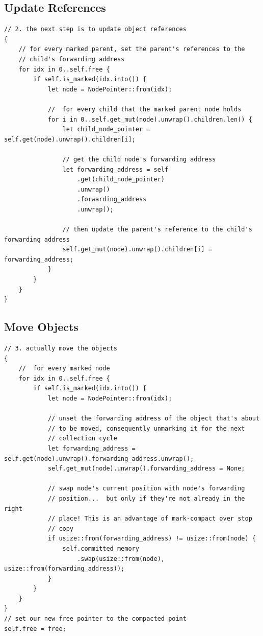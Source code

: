 \documentclass[index]{subfiles}
\begin{document}
\subsection{Update References}
\begin{verbatim}
// 2. the next step is to update object references
{
    // for every marked parent, set the parent's references to the
    // child's forwarding address
    for idx in 0..self.free {
        if self.is_marked(idx.into()) {
            let node = NodePointer::from(idx);

            //  for every child that the marked parent node holds
            for i in 0..self.get_mut(node).unwrap().children.len() {
                let child_node_pointer = self.get(node).unwrap().children[i];

                // get the child node's forwarding address
                let forwarding_address = self
                    .get(child_node_pointer)
                    .unwrap()
                    .forwarding_address
                    .unwrap();

                // then update the parent's reference to the child's forwarding address
                self.get_mut(node).unwrap().children[i] = forwarding_address;
            }
        }
    }
}
\end{verbatim}
\subsection{Move Objects}
\begin{verbatim}
// 3. actually move the objects
{
    //  for every marked node
    for idx in 0..self.free {
        if self.is_marked(idx.into()) {
            let node = NodePointer::from(idx);

            // unset the forwarding address of the object that's about
            // to be moved, consequently unmarking it for the next
            // collection cycle
            let forwarding_address = self.get(node).unwrap().forwarding_address.unwrap();
            self.get_mut(node).unwrap().forwarding_address = None;

            // swap node's current position with node's forwarding
            // position...  but only if they're not already in the right
            // place! This is an advantage of mark-compact over stop
            // copy
            if usize::from(forwarding_address) != usize::from(node) {
                self.committed_memory
                    .swap(usize::from(node), usize::from(forwarding_address));
            }
        }
    }
}
// set our new free pointer to the compacted point
self.free = free;
\end{verbatim}
\end{document}
